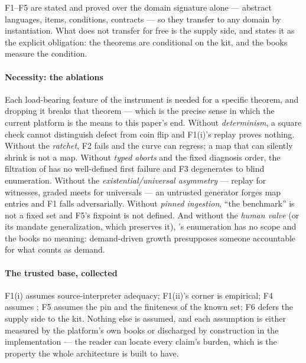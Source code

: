 \begin{theorem}
\label{thm:generic}
F1--F5 are stated and proved over the domain signature alone ---
abstract languages, items, conditions, contracts --- so they transfer
to any domain by instantiation. What does not transfer for free is
the supply side, and  states it as the explicit
obligation: the theorems are conditional on the kit, and the books
measure the condition.
\end{theorem}

\paragraph{Necessity: the ablations}
Each load-bearing feature of the instrument is needed for a specific
theorem, and dropping it breaks that theorem --- which is the precise
sense in which the current platform is the means to this paper's end.
Without \emph{determinism}, a square check cannot distinguish defect
from coin flip and F1(i)'s replay proves nothing. Without the
\emph{ratchet}, F2 fails and the curve can regress; a map that can
silently shrink is not a map. Without \emph{typed aborts} and the
fixed diagnosis order, the filtration of  has no
well-defined first failure and F3 degenerates to blind enumeration.
Without the \emph{existential/universal asymmetry} --- replay for
witnesses, graded meets for universals --- an untrusted generator
forges map entries and F1 falls adversarially. Without \emph{pinned
ingestion}, ``the benchmark'' is not a fixed set and F5's fixpoint is
not defined. And without the \emph{human valve} (or its mandate
generalization, which preserves it), 's enumeration
has no scope and the books no meaning: demand-driven growth
presupposes someone accountable for what counts as demand.

\paragraph{The trusted base, collected}
F1(i) assumes source-interpreter adequacy; F1(ii)'s corner is
empirical; F4 assumes ; F5 assumes the pin
and the finiteness of the known set; F6 defers the supply side to the
kit. Nothing else is assumed, and each assumption is either measured
by the platform's own books or discharged by construction in the
implementation --- the reader can locate every claim's burden, which
is the property the whole architecture is built to have.
